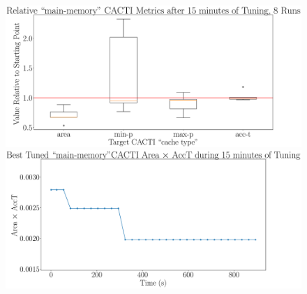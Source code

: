 \documentclass[12pt, a4paper]{article}
\begin{document}
\begin{figure}[htpb]
    \begin{minipage}{.48\textwidth}
        \centering
        \includegraphics[width=.8\textwidth]{target_area_times_acct_900_main-memory}
    \end{minipage}%
    \begin{minipage}{.48\textwidth}
        \centering
        \includegraphics[width=.8\textwidth]{target_area_times_acct_900_main-memory_best}
    \end{minipage}%
\end{figure}
\end{document}
